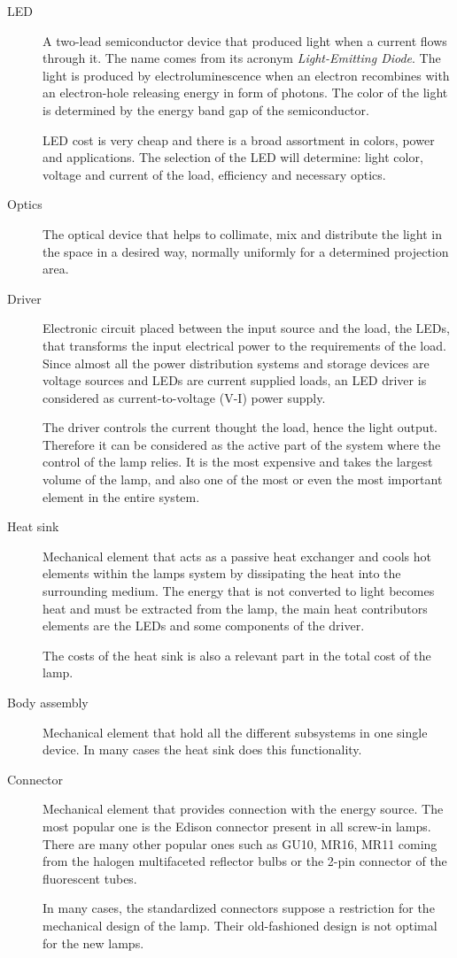 \begin{description}
  \item[LED] A two-lead semiconductor device that produced light when a current flows through it. The name comes from its acronym \emph{Light-Emitting Diode}. The light is produced by electroluminescence when an electron recombines with an electron-hole releasing energy in form of photons. The color of the light is determined by the energy band gap of the semiconductor.

   LED cost is very cheap and there is a broad assortment in colors, power and applications. The selection of the LED will determine: light color, voltage and current of the load, efficiency and necessary optics.

  \item[Optics] The optical device that helps to collimate, mix and distribute the light in the space in a desired way, normally uniformly for a determined projection area.

  \item[Driver] Electronic circuit placed between the input source and the load, the LEDs, that transforms the input electrical power to the requirements of the load. Since almost all the power distribution systems and storage devices are voltage sources and LEDs are current supplied loads, an LED driver is considered as current-to-voltage (V-I) power supply.

      The driver controls the current thought the load, hence the light output. Therefore it can be considered as the active part of the system where the control of the lamp relies. It is the most expensive and takes the largest volume of the lamp, and also one of the most or even the most important element in the entire system.

  \item[Heat sink] Mechanical element that acts as a passive heat exchanger and cools hot elements within the lamps system by dissipating the heat into the surrounding medium. The energy that is not converted to light becomes heat and must be extracted from the lamp, the main heat contributors elements are the LEDs and some components of the driver.

      The costs of the heat sink is also a relevant part in the total cost of the lamp.

  \item[Body assembly] Mechanical element that hold all the different subsystems in one single device. In many cases the heat sink does this functionality.

  \item[Connector] Mechanical element that provides connection with the energy source. The most popular one is the Edison connector present in all screw-in lamps. There are many other popular ones such as GU10, MR16, MR11 coming from the halogen multifaceted reflector bulbs or the 2-pin connector of the fluorescent tubes.

      In many cases, the standardized connectors suppose a restriction for the mechanical design of the lamp. Their old-fashioned design is not optimal for the new lamps.


\end{description}


